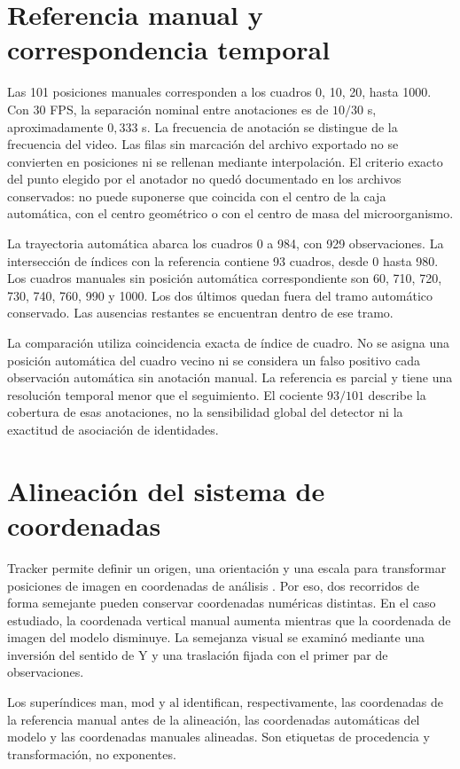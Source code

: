 \section{Referencia manual y correspondencia temporal}

Las 101 posiciones manuales corresponden a los cuadros 0, 10, 20, hasta 1000. Con 30 FPS, la separación nominal entre anotaciones es de $10/30$ s, aproximadamente $0{,}333$ s. La frecuencia de anotación se distingue de la frecuencia del video. Las filas sin marcación del archivo exportado no se convierten en posiciones ni se rellenan mediante interpolación. El criterio exacto del punto elegido por el anotador no quedó documentado en los archivos conservados: no puede suponerse que coincida con el centro de la caja automática, con el centro geométrico o con el centro de masa del microorganismo.

La trayectoria automática abarca los cuadros 0 a 984, con 929 observaciones. La intersección de índices con la referencia contiene 93 cuadros, desde 0 hasta 980. Los cuadros manuales sin posición automática correspondiente son 60, 710, 720, 730, 740, 760, 990 y 1000. Los dos últimos quedan fuera del tramo automático conservado. Las ausencias restantes se encuentran dentro de ese tramo.

La comparación utiliza coincidencia exacta de índice de cuadro. No se asigna una posición automática del cuadro vecino ni se considera un falso positivo cada observación automática sin anotación manual. La referencia es parcial y tiene una resolución temporal menor que el seguimiento. El cociente $93/101$ describe la cobertura de esas anotaciones, no la sensibilidad global del detector ni la exactitud de asociación de identidades.

\section{Alineación del sistema de coordenadas}

Tracker permite definir un origen, una orientación y una escala para transformar posiciones de imagen en coordenadas de análisis \cite{tracker2026}. Por eso, dos recorridos de forma semejante pueden conservar coordenadas numéricas distintas. En el caso estudiado, la coordenada vertical manual aumenta mientras que la coordenada de imagen del modelo disminuye. La semejanza visual se examinó mediante una inversión del sentido de Y y una traslación fijada con el primer par de observaciones.

Los superíndices $\mathrm{man}$, $\mathrm{mod}$ y $\mathrm{al}$ identifican, respectivamente, las coordenadas de la referencia manual antes de la alineación, las coordenadas automáticas del modelo y las coordenadas manuales alineadas. Son etiquetas de procedencia y transformación, no exponentes.

